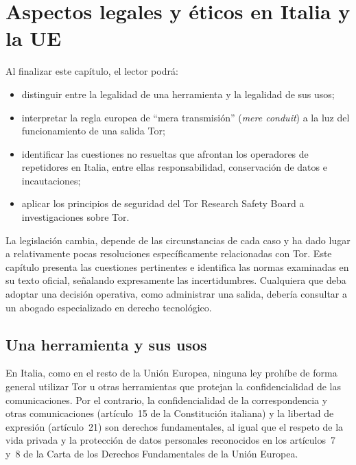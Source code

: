 \chapter{Aspectos legales y éticos en Italia y la UE}\label{cap:25-legale}

\begin{obiettivi}
Al finalizar este capítulo, el lector podrá:
\begin{itemize}[nosep]
  \item distinguir entre la legalidad de una herramienta y la legalidad de sus usos;
  \item interpretar la regla europea de \enquote{mera transmisión} (\emph{mere conduit}) a la luz del funcionamiento de una salida Tor;
  \item identificar las cuestiones no resueltas que afrontan los operadores de repetidores en Italia, entre ellas responsabilidad, conservación de datos e incautaciones;
  \item aplicar los principios de seguridad del Tor Research Safety Board a investigaciones sobre Tor.
\end{itemize}
\end{obiettivi}

\begin{attenzione}
La legislación cambia, depende de las circunstancias de cada caso y ha dado lugar a relativamente pocas resoluciones específicamente relacionadas con Tor. Este capítulo presenta las cuestiones pertinentes e identifica las normas examinadas en su texto oficial, señalando expresamente las incertidumbres. Cualquiera que deba adoptar una decisión operativa, como administrar una salida, debería consultar a un abogado especializado en derecho tecnológico.
\end{attenzione}

\section{Una herramienta y sus usos}\label{sec:legale-strumento}

En Italia, como en el resto de la Unión Europea, ninguna ley prohíbe de forma general utilizar Tor u otras herramientas que protejan la confidencialidad de las comunicaciones. Por el contrario, la confidencialidad de la correspondencia y otras comunicaciones (artículo~15 de la Constitución italiana) y la libertad de expresión (artículo~21) son derechos fundamentales, al igual que el respeto de la vida privada y la protección de datos personales reconocidos en los artículos~7 y~8 de la Carta de los Derechos Fundamentales de la Unión Europea.

